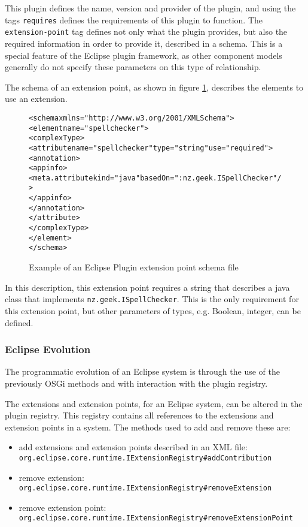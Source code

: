 This plugin defines the name, version and provider of the plugin, and using the tags \texttt{requires} defines the requirements of this plugin to function.
The \texttt{extension-point} tag defines not only what the plugin provides, but also the required information in order to provide it, described in a schema.
This is a special feature of the Eclipse plugin framework, as other component models generally do not specify these parameters on this type of relationship. 

The schema of an extension point, as shown in figure \ref{eclipseextensionschema}, describes the elements to use an extension.

\begin{figure}[htp]
\begin{center}
\begin{alltt}
<schema xmlns="http://www.w3.org/2001/XMLSchema">
 <element name="spellchecker">
  <complexType>
   <attribute name="spellchecker" type="string" use="required">
    <annotation>
     <appinfo>
      <meta.attribute kind="java" basedOn=":nz.geek.ISpellChecker"/>
     </appinfo>
    </annotation>
   </attribute>
  </complexType>
 </element>
</schema>
\end{alltt}
  \caption[Eclipse Plugin extension point schema]{Example of an Eclipse Plugin extension point schema file}
  \label{eclipseextensionschema}
\end{center}
\end{figure}

In this description, this extension point requires a string that describes a java class that implements \texttt{nz.geek.ISpellChecker}.
This is the only requirement for this extension point, but other parameters of types, e.g. Boolean, integer, can be defined.

\subsubsection{Eclipse Evolution}
The programmatic evolution of an Eclipse system is through the use of the previously OSGi methods and with interaction with the plugin registry.

The extensions and extension points, for an Eclipse system, can be altered in the plugin registry.
This registry contains all references to the extensions and extension points in a system.
The methods used to add and remove these are:

\begin{itemize}
  \item add extensions and extension points described in an XML file: \\ \texttt{org.eclipse.core.runtime.IExtensionRegistry}\verb+#+\texttt{addContribution}
  \item remove extension: \\ \texttt{org.eclipse.core.runtime.IExtensionRegistry}\verb+#+\texttt{removeExtension}
  \item remove extension point:\\ \texttt{org.eclipse.core.runtime.IExtensionRegistry}\verb+#+\texttt{removeExtensionPoint}
\end{itemize}

